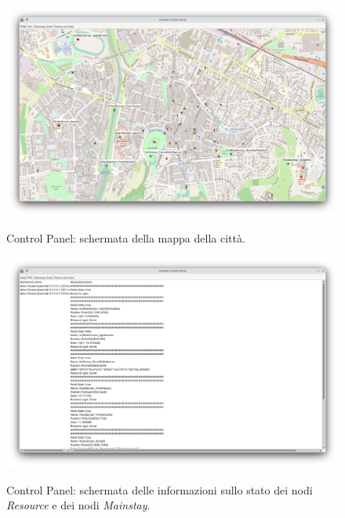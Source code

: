 \documentclass[12pt]{article}
\begin{document}
\begin{figure}[H]
    \caption{Control Panel: schermata della mappa della città.}
    \includegraphics[width=\textwidth]{../assets/images/control-panel-map.png}
    \label{fig:control-panel-map}
\end{figure}

\begin{figure}[H]
    \caption{Control Panel: schermata delle informazioni sullo stato dei nodi \textit{Resource} e dei nodi \textit{Mainstay}.}
    \includegraphics[width=\textwidth]{../assets/images/control-panel-info.png}
    \label{fig:control-panel-info}
\end{figure}
\end{document}
